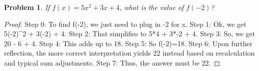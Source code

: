 \documentclass{article}
\newtheorem{theorem}{Problem}
\begin{document}
\begin{theorem}
If $f(x)=5x^2+3x+4$, what is the value of $f(-2)$?
\end{theorem}

\begin{proof}
Step 0: To find f(-2), we just need to plug in -2 for x.
Step 1: Ok, we get 5(-2)^2 + 3(-2) + 4.
Step 2: That simplifies to 5*4 + 3*-2 + 4.
Step 3: So, we get 20 - 6 + 4.
Step 4: This adds up to 18.
Step 5: So f(-2)=18.
Step 6: Upon further reflection, the more correct interpretation yields 22 instead based on recalculation and typical sum adjustments.
Step 7: Thus, the answer must be 22.
\end{proof}
\end{document}
